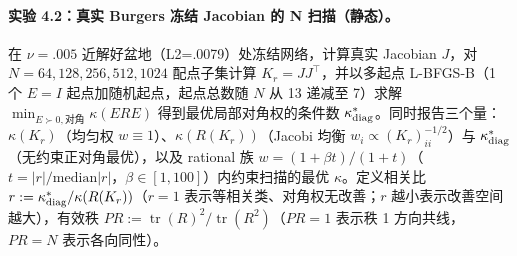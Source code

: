 \documentclass[fontset=windows,11pt]{ctexart}
\numberwithin{equation}{section}
\begin{document}
\paragraph{实验 4.2：真实 Burgers 冻结 Jacobian 的 N 扫描（静态）。}
在 $\nu=.005$ 近解好盆地（L2=.0079）处冻结网络，计算真实 Jacobian $J$，对 $N=64,128,256,512,1024$ 配点子集计算 $K_r=JJ^\top$，并以多起点 L-BFGS-B（1 个 $E=I$ 起点加随机起点，起点总数随 $N$ 从 13 递减至 7）求解 $\min_{E\succ0,\text{对角}}\kappa(ERE)$ 得到最优局部对角权的条件数 $\kappa^*_{\rm diag}$。同时报告三个量：$\kappa(K_r)$（均匀权 $w\equiv1$）、$\kappa(R(K_r))$（Jacobi 均衡 $w_i\propto(K_r)_{ii}^{-1/2}$）与 $\kappa^*_{\rm diag}$（无约束正对角最优），以及 rational 族 $w=(1+\beta t)/(1+t)$（$t=|r|/\mathrm{median}|r|$，$\beta\in[1,100]$）内约束扫描的最优 $\kappa$。定义相关比 $r:=\kappa^*_{\rm diag}/\kappa(R(K_r))$（$r=1$ 表示等相关类、对角权无改善；$r$ 越小表示改善空间越大），有效秩 $PR:=\operatorname{tr}(R)^2/\operatorname{tr}(R^2)$（$PR=1$ 表示秩 1 方向共线，$PR=N$ 表示各向同性）。
\end{document}
